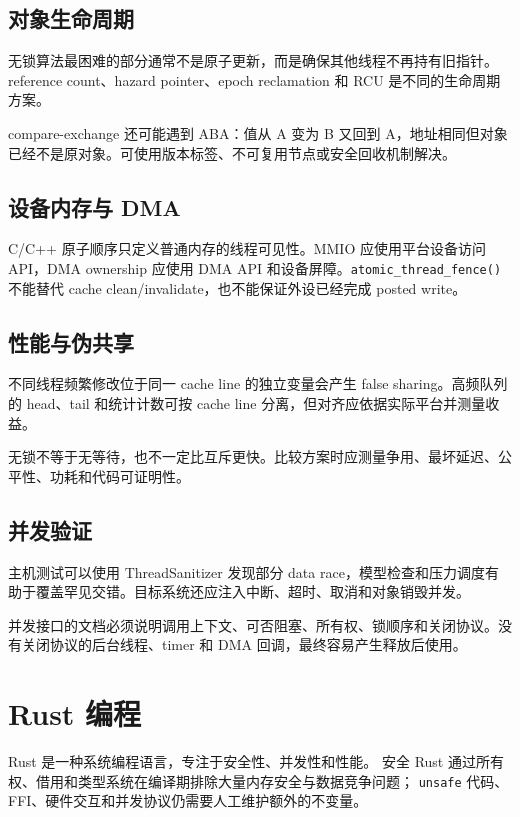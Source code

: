 \subsection{对象生命周期}

无锁算法最困难的部分通常不是原子更新，而是确保其他线程不再持有旧指针。reference count、hazard pointer、epoch reclamation 和 RCU 是不同的生命周期方案。

compare-exchange 还可能遇到 ABA：值从 A 变为 B 又回到 A，地址相同但对象已经不是原对象。可使用版本标签、不可复用节点或安全回收机制解决。

\subsection{设备内存与 DMA}

C/C++ 原子顺序只定义普通内存的线程可见性。MMIO 应使用平台设备访问 API，DMA ownership 应使用 DMA API 和设备屏障。\texttt{atomic\_thread\_fence()} 不能替代 cache clean/invalidate，也不能保证外设已经完成 posted write。

\subsection{性能与伪共享}

不同线程频繁修改位于同一 cache line 的独立变量会产生 false sharing。高频队列的 head、tail 和统计计数可按 cache line 分离，但对齐应依据实际平台并测量收益。

无锁不等于无等待，也不一定比互斥更快。比较方案时应测量争用、最坏延迟、公平性、功耗和代码可证明性。

\subsection{并发验证}

主机测试可以使用 ThreadSanitizer 发现部分 data race，模型检查和压力调度有助于覆盖罕见交错。目标系统还应注入中断、超时、取消和对象销毁并发。

并发接口的文档必须说明调用上下文、可否阻塞、所有权、锁顺序和关闭协议。没有关闭协议的后台线程、timer 和 DMA 回调，最终容易产生释放后使用。

\section{Rust 编程}

Rust 是一种系统编程语言，专注于安全性、并发性和性能。
安全 Rust 通过所有权、借用和类型系统在编译期排除大量内存安全与数据竞争问题；
\texttt{unsafe} 代码、FFI、硬件交互和并发协议仍需要人工维护额外的不变量。

